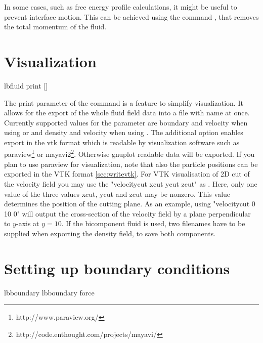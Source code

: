 In some cases, such as free energy profile calculations, it might be useful to prevent interface motion. This can be achieved using the command , that removes the total momentum of the fluid.


\section{Visualization}
\label{ssec:LBvisualization}
\begin{essyntax}
  lbfluid print    []
\end{essyntax}
The print parameter of the  command is a feature to simplify visualization. It allows for the export of the whole fluid field data into a 
file with name  at once. Currently supported values for the 
parameter  are boundary and velocity when using  or  and density and velocity when using . The additional option 
 enables export in the vtk format which is readable by visualization software such as paraview\footnote{http://www.paraview.org/} or mayavi2\footnote{http://code.enthought.com/projects/mayavi/}. Otherwise gnuplot readable data will be 
exported. If you plan to use paraview for visualization, note that also the 
particle positions can be exported in the VTK format \ref{sec:writevtk}. For VTK visualisation of 2D cut of the velocity field you may use the "velocitycut xcut ycut zcut" as . Here, only one value of the three values xcut, ycut and zcut may be nonzero. This value determines the position of the cutting plane. As an example, using "velocitycut 0 10 0" will output the cross-section of the velocity field by a plane perpendicular to $y$-axis at $y = 10$.
If the  bicomponent fluid is used, two filenames have to be supplied when exporting the density field, to save both components.

\section{Setting up boundary conditions}
\begin{essyntax}
   lbboundary   
   lbboundary force 
  \begin{features}
  \end{features}
\end{essyntax}

